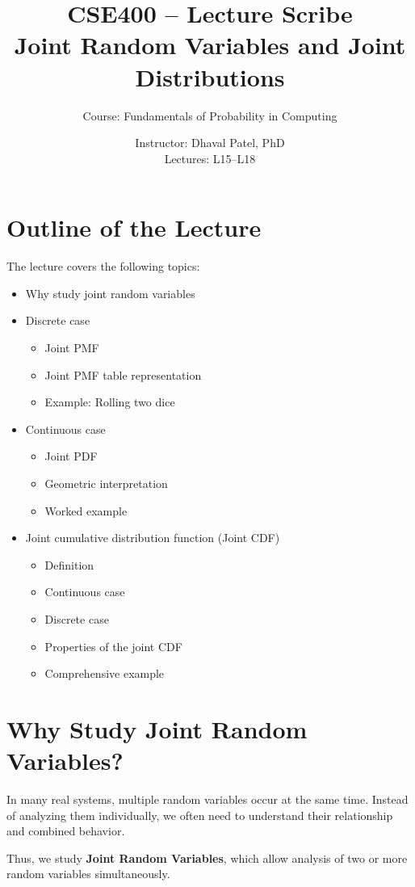 \documentclass[12pt]{article}
\title{CSE400 -- Lecture Scribe\\
Joint Random Variables and Joint Distributions}
\author{Course: Fundamentals of Probability in Computing}
\date{Instructor: Dhaval Patel, PhD \\ Lectures: L15--L18}
\begin{document}
\maketitle

\section{Outline of the Lecture}

The lecture covers the following topics:

\begin{itemize}
\item Why study joint random variables
\item Discrete case
\begin{itemize}
\item Joint PMF
\item Joint PMF table representation
\item Example: Rolling two dice
\end{itemize}
\item Continuous case
\begin{itemize}
\item Joint PDF
\item Geometric interpretation
\item Worked example
\end{itemize}
\item Joint cumulative distribution function (Joint CDF)
\begin{itemize}
\item Definition
\item Continuous case
\item Discrete case
\item Properties of the joint CDF
\item Comprehensive example
\end{itemize}
\end{itemize}

\section{Why Study Joint Random Variables?}

In many real systems, multiple random variables occur at the same time. Instead of analyzing them individually, we often need to understand their relationship and combined behavior.

Thus, we study \textbf{Joint Random Variables}, which allow analysis of two or more random variables simultaneously.
\end{document}
